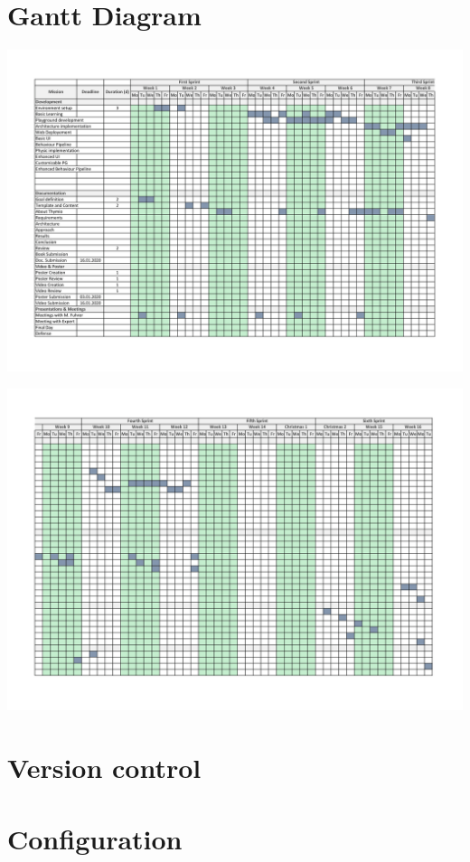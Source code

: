 \documentclass{scrbook}
\begin{document}
\chapter{Gantt Diagram}
\begin{center}
  \includegraphics[scale = 0.28, angle=-90]{./Gantt-1}
\end{center}
\begin{center}
  \includegraphics[scale = 0.28,  angle=-90]{./Gantt-2}
\end{center}

\chapter{Version control}

\chapter{Configuration}
\end{document}
